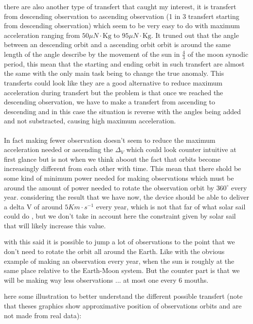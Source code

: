 \documentclass{article} %
\begin{document}
			there are also another type of transfert that caught my interest, it is transfert from descending observation to ascending observation (1 in 3 transfert starting from descending observation) which seem to be very easy to do with maximum acceleration ranging from  $50 \mu{N}\cdot\text{Kg}$ to $95 \mu{N}\cdot\text{Kg}$. It truned out that the angle between an descending orbit and a ascending orbit orbit is around the same length of the angle describe by the movement of the sun in $\frac{4}{3}$ of the moon synodic period, this mean that the starting and ending orbit in such transfert are almost the same with the only main task being to change the true anomaly. This transferts could look like they are a good alternative to reduce maximum acceleration during transfert but the problem is that once we reached the descending observation, we have to make a transfert from ascending to descending and in this case the situation is reverse with the angles being added and not substracted, causing high maximum acceleration.
			\\ \\
			In fact making fewer observation doesn't seem to reduce the maximum acceleration needed or ascending the $\Delta_{V}$ which could look counter intuitive at first glance but is not when we think aboout the fact that orbits become increasingly different from each other with time. This mean that there shold be some kind of minimum power needed for making observations which must be around the amount of power needed to rotate the observation orbit by $360^\circ$ every year. considering the result that we have now, the device should be able to deliver a delta V of around $5Km\cdot s^{-1} $ every year, which is not that far of what solar sail could do , but we don't take in account here the constraint given by solar sail that will likely increase this value.
			
			
			
			 with this said it is possible to jump a lot of observations to the point that we don't need to rotate the orbit all around the Earth. Like with the obvious example of making an observation every year, when the sun is roughly at the same place relative to the Earth-Moon system. But the counter part is that we will be making way less observations ... at most one every 6 mouths. 
			
			here some illustration to better understand the different possible transfert (note that theses graphics show approximative position of observations orbits and are not made from real data):
			
\end{document}
